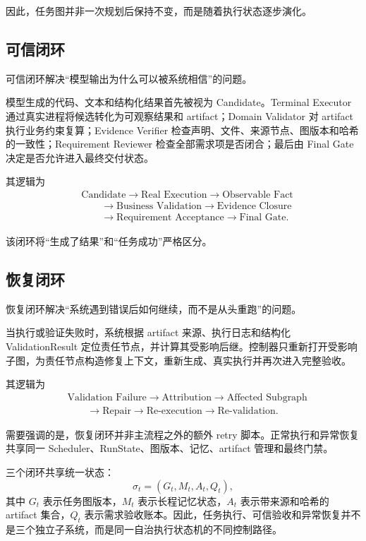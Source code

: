 \documentclass[UTF8,a4paper,12pt,oneside]{ctexbook}
\begin{document}
因此，任务图并非一次规划后保持不变，而是随着执行状态逐步演化。

\subsection{可信闭环}

可信闭环解决“模型输出为什么可以被系统相信”的问题。

模型生成的代码、文本和结构化结果首先被视为 Candidate。Terminal Executor 通过真实进程将候选转化为可观察结果和 artifact；Domain Validator 对 artifact 执行业务约束复算；Evidence Verifier 检查声明、文件、来源节点、图版本和哈希的一致性；Requirement Reviewer 检查全部需求项是否闭合；最后由 Final Gate 决定是否允许进入最终交付状态。

其逻辑为
\[
\begin{aligned}
&\text{Candidate}
\rightarrow \text{Real Execution}
\rightarrow \text{Observable Fact} \\[3pt]
&\qquad\rightarrow \text{Business Validation}
\rightarrow \text{Evidence Closure} \\[3pt]
&\qquad\rightarrow \text{Requirement Acceptance}
\rightarrow \text{Final Gate}.
\end{aligned}
\]

该闭环将“生成了结果”和“任务成功”严格区分。

\subsection{恢复闭环}

恢复闭环解决“系统遇到错误后如何继续，而不是从头重跑”的问题。

当执行或验证失败时，系统根据 artifact 来源、执行日志和结构化 ValidationResult 定位责任节点，并计算其受影响后继。控制器只重新打开受影响子图，为责任节点构造修复上下文，重新生成、真实执行并再次进入完整验收。

其逻辑为
\[
\begin{aligned}
&\text{Validation Failure}
\rightarrow \text{Attribution}
\rightarrow \text{Affected Subgraph} \\[3pt]
&\qquad\rightarrow \text{Repair}
\rightarrow \text{Re-execution}
\rightarrow \text{Re-validation}.
\end{aligned}
\]

需要强调的是，恢复闭环并非主流程之外的额外 retry 脚本。正常执行和异常恢复共享同一 Scheduler、RunState、图版本、记忆、artifact 管理和最终门禁。

三个闭环共享统一状态：
\[
\sigma_t=(G_t,M_t,A_t,Q_t),
\]
其中 $G_t$ 表示任务图版本，$M_t$ 表示长程记忆状态，$A_t$ 表示带来源和哈希的 artifact 集合，$Q_t$ 表示需求验收账本。因此，任务执行、可信验收和异常恢复并不是三个独立子系统，而是同一自治执行状态机的不同控制路径。
\end{document}
